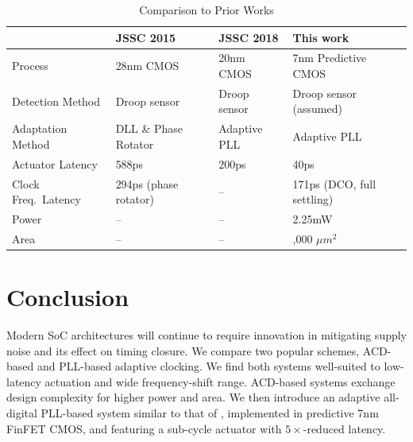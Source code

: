 \documentclass[twoside,9pt,journal,letterpage]{IEEEtran}
\begin{document}
\begin{table}[!ht]
\caption{Comparison to Prior Works} 
\label{table:comparison}
\centering
\begin{tabularx}{\columnwidth}{
	| >{\centering\arraybackslash}X 
	| >{\centering\arraybackslash}X 
	| >{\centering\arraybackslash}X 
	| >{\centering\arraybackslash}X | }
	\hline
	& JSSC 2015 \cite{wilcox2015} & JSSC 2018 \cite{hashimoto2018} & This work \\
	\hline
	Process & 28nm CMOS & 20nm CMOS & 7nm Predictive CMOS  \\
	\hline
	Detection Method & Droop sensor & Droop sensor & Droop sensor (assumed)  \\
	\hline
	Adaptation Method & DLL \& Phase Rotator & Adaptive PLL & Adaptive PLL  \\
	\hline
	Actuator Latency & 588ps & 200ps & 40ps  \\
	\hline
	Clock Freq.\ Latency & 294ps (phase rotator) & -- & 171ps (DCO, full settling) \\
	\hline
	Power & -- & -- & 2.25mW \\
	\hline
	Area & -- & -- & 10,000 $\mu m^2$ \\
	\hline
\end{tabularx}
\end{table}


\vspace{-5pt}
\section{Conclusion}
\label{sec:conclusion}

Modern SoC architectures will continue to require innovation in mitigating supply noise and its effect on timing closure. We compare two popular schemes, ACD-based and PLL-based adaptive clocking. We find both systems well-suited to low-latency actuation and wide frequency-shift range. ACD-based systems exchange design complexity for higher power and area. We then introduce an adaptive all-digital PLL-based system similar to that of \cite{hashimoto2018}, implemented in predictive 7nm FinFET CMOS, and featuring a sub-cycle actuator with $5\times$-reduced latency. 

\vspace{-5pt}

\begingroup
\raggedright

\endgroup
\end{document}
